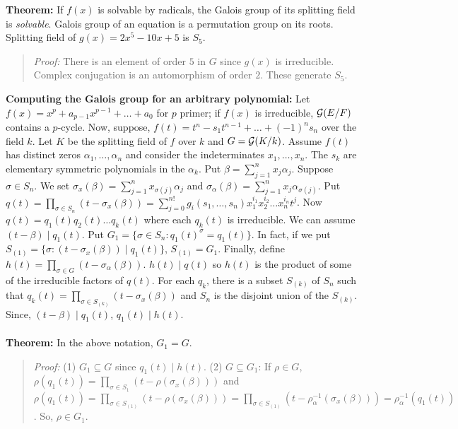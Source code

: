 {\bf Theorem:}
If $f(x)$ is solvable by radicals, the Galois group of its splitting field
is \emph{solvable}.  Galois group of an equation is a permutation group on its roots.
Splitting field of $g(x)= 2x^5 -10 x+5$ is $S_5$.
\begin{quote}
\emph{Proof:} 
There is an element of order $5$ in $G$ since $g(x)$ is irreducible.  Complex conjugation
is an automorphism of order $2$.  These generate $S_5$.
\end{quote}
{\bf Computing the Galois group for an arbitrary polynomial:}
Let $f(x)= x^p + a_{p-1}x^{p-1} + \ldots + a_0$ for $p$ primer; if $f(x)$ is irreducible,
${\cal G}(E/F)$ contains a $p$-cycle.
Now, suppose, 
$f(t) = t^n -s_1 t^{n-1} + \ldots + (-1)^{n}s_n$ over the field $k$.  
Let $K$ be the splitting field of $f$ over $k$ and $G = {\cal G}(K/k)$.
Assume
$f(t)$ has distinct zeros $\alpha_1, \ldots , \alpha_n$ and consider the
indeterminates $x_1, \ldots, x_n$.  The $s_k$ are elementary symmetric polynomials
in the $\alpha_k$.  Put $\beta = \sum_{j=1}^n x_j \alpha_j$.  Suppose
$\sigma \in S_n$.  We set $\sigma_x ( \beta ) = \sum_{j=1}^n x_{\sigma(j)} \alpha_j$
and $\sigma_{\alpha} ( \beta ) = \sum_{j=1}^n x_{j} \alpha_{\sigma(j)}$. Put
$q(t) = \prod_{\sigma \in S_n} (t - \sigma_x(\beta)) = 
\sum_{j=0}^{n!} g_i (s_1 , \ldots, s_n) x_1^{i_1} x_2^{i_2} \ldots x_n^{i_n} t^j$.
Now $q(t) = q_1(t) q_2(t) \ldots q_k(t)$ where each $q_k(t)$ is irreducible.
We can assume $(t - \beta) \mid q_1(t)$.
Put $G_1 = \{ \sigma \in S_n: q_1(t)^{\sigma} = q_1(t) \}$.  In fact, if we
put $S_{(1)} = \{ \sigma : (t - \sigma_x(\beta)) \mid q_1 (t) \}$, $S_{(1)} = G_1$.
Finally, define
$h(t) = \prod_{\sigma \in G} (t - \sigma_{\alpha}(\beta))$. $h(t) \mid q(t)$ so
$h(t)$ is the product of some of the irreducible factors of $q(t)$.
For each $q_k$, there is a subset $S_{(k)}$ of $S_n$ such that
$q_k(t) = \prod_{\sigma \in S_{(k)}} (t - \sigma_x(\beta))$ and $S_n$ is the disjoint union
of the $S_{(k)}$.
Since, $(t - \beta) \mid q_1(t)$, $q_1(t) \mid h(t)$.
\\
\\
{\bf Theorem:} In the above notation, $G_1 = G$.
\begin{quote}
\emph{Proof:} (1) $G_1 \subseteq G$ since $q_1(t) \mid h(t)$. (2) $G \subseteq G_1$:
If $\rho \in G$, $\rho(q_1(t)) = \prod_{\sigma \in S_1} (t- \rho(\sigma_x(\beta)))$ and
$\rho(q_1(t)) = \prod_{\sigma \in S_{(1)}} (t- \rho(\sigma_x(\beta))) = 
\prod_{\sigma \in S_{(1)}} (t- \rho_{\alpha}^{-1}(\sigma_{x}(\beta))) = \rho_{\alpha}^{-1}(q_1(t))$.
So, $\rho \in G_1$.
\end{quote}

